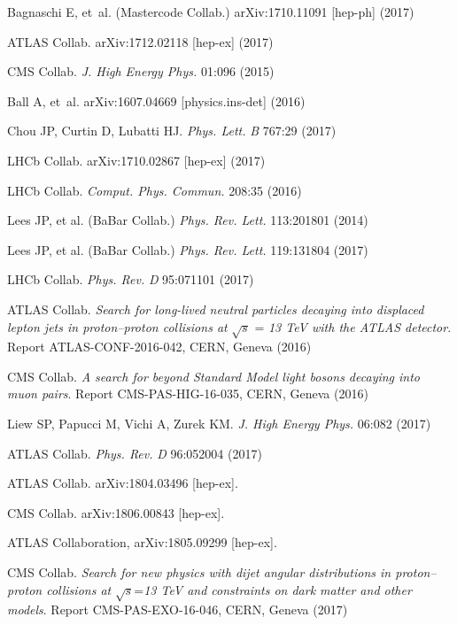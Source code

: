 \documentclass{ar-1col}
\begin{document}
\begin{thebibliography}{175}
Bagnaschi E, et~al. (Mastercode Collab.) arXiv:1710.11091 [hep-ph] (2017)

{ATLAS Collab}. arXiv:1712.02118 [hep-ex] (2017)

{CMS Collab}. \textit{J. High Energy Phys.} 01:096 (2015)

Ball A, et~al. arXiv:1607.04669 [physics.ins-det] (2016)

Chou JP, Curtin D, Lubatti HJ. \textit{Phys. Lett.} \textit{B} 767:29 (2017)

{LHCb Collab}. arXiv:1710.02867 [hep-ex] (2017)

{LHCb Collab}. \textit{Comput. Phys. Commun.} 208:35 (2016)

{Lees JP, et al. (BaBar Collab}.) \textit{Phys. Rev. Lett.} 113:201801 (2014)

{Lees JP, et al. (BaBar Collab}.) \textit{Phys. Rev. Lett.} 119:131804 (2017)

{LHCb Collab}. \textit{Phys. Rev.} \textit{D} 95:071101 (2017)

ATLAS Collab. \textit{Search for long-lived neutral particles decaying into displaced lepton jets in proton--proton collisions at} $\sqrt{s}$ = \textit{13 TeV with the ATLAS detector}. Report ATLAS-CONF-2016-042, CERN, Geneva (2016)

CMS Collab. \textit{A search for beyond Standard Model light bosons decaying into muon pairs}.
Report CMS-PAS-HIG-16-035, CERN, Geneva (2016)

Liew SP, Papucci M, Vichi A, Zurek KM. \textit{J. High Energy Phys.} 06:082 (2017)

{ATLAS Collab}. \textit{Phys. Rev.} \textit{D} 96:052004 (2017)

{ATLAS Collab}. arXiv:1804.03496 [hep-ex].
  
{CMS Collab.} arXiv:1806.00843 [hep-ex].
 
{ATLAS Collaboration},  arXiv:1805.09299 [hep-ex].
  
CMS Collab.\textit{ Search for new physics with dijet angular distributions in proton--proton collisions at} $\sqrt{s}$=\textit{13 TeV and constraints on dark matter and other models}. Report CMS-PAS-EXO-16-046, CERN, Geneva (2017)


\end{thebibliography}
\end{document}
